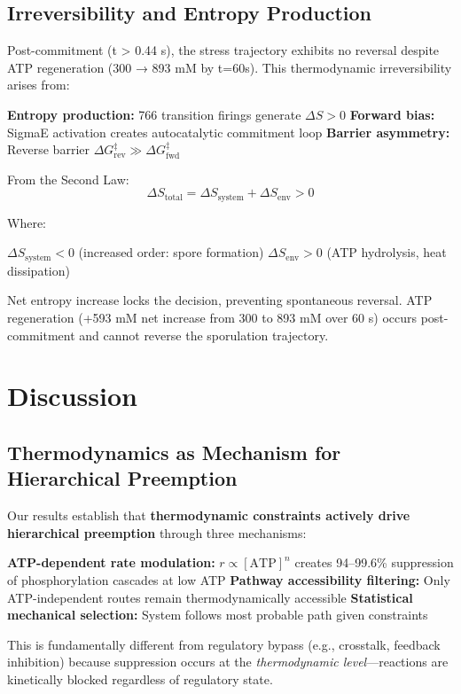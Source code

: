 \documentclass[twocolumn,11pt]{article}
\begin{document}
\subsection{Irreversibility and Entropy Production}

Post-commitment (t > 0.44 s), the stress trajectory exhibits no reversal despite ATP regeneration (300 → 893 mM by t=60s). This thermodynamic irreversibility arises from:


\textbf{Entropy production:} 766 transition firings generate $\Delta S > 0$
\textbf{Forward bias:} SigmaE activation creates autocatalytic commitment loop
\textbf{Barrier asymmetry:} Reverse barrier $\Delta G^\ddagger_{\text{rev}} \gg \Delta G^\ddagger_{\text{fwd}}$


From the Second Law:
\begin{equation}
    \Delta S_{\text{total}} = \Delta S_{\text{system}} + \Delta S_{\text{env}} > 0
\end{equation}

Where:

$\Delta S_{\text{system}} < 0$ (increased order: spore formation)
$\Delta S_{\text{env}} > 0$ (ATP hydrolysis, heat dissipation)


Net entropy increase locks the decision, preventing spontaneous reversal. ATP regeneration (+593 mM net increase from 300 to 893 mM over 60 s) occurs post-commitment and cannot reverse the sporulation trajectory.

\section{Discussion}

\subsection{Thermodynamics as Mechanism for Hierarchical Preemption}

Our results establish that \textbf{thermodynamic constraints actively drive hierarchical preemption} through three mechanisms:


\textbf{ATP-dependent rate modulation:} $r \propto [\text{ATP}]^n$ creates 94--99.6\% suppression of phosphorylation cascades at low ATP
\textbf{Pathway accessibility filtering:} Only ATP-independent routes remain thermodynamically accessible
\textbf{Statistical mechanical selection:} System follows most probable path given constraints


This is fundamentally different from regulatory bypass (e.g., crosstalk, feedback inhibition) because suppression occurs at the \textit{thermodynamic level}—reactions are kinetically blocked regardless of regulatory state.
\end{document}
